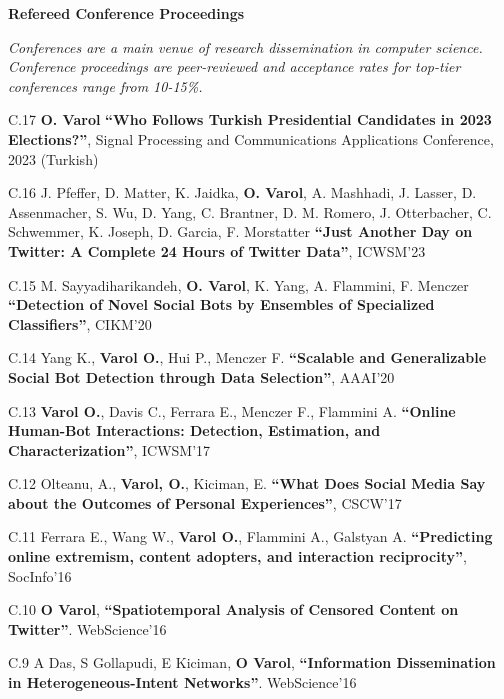 \documentclass[10pt]{article}
\newenvironment{innerlist}[1][\enskip\textbullet]%
        {\begin{compactitem}[#1]}{\end{compactitem}}
\begin{document}
\textbf{Refereed Conference Proceedings}

\textit{Conferences are a main venue of research dissemination in computer science. Conference proceedings are peer-reviewed and acceptance rates for top-tier conferences range from 10-15\%.}
\begin{innerlist}

\item[C.17] \textbf{O. Varol} \textbf{``Who Follows Turkish Presidential Candidates in 2023 Elections?''}, Signal Processing and Communications Applications Conference, 2023 (Turkish)

\item[C.16] J. Pfeffer, D. Matter, K. Jaidka, \textbf{O. Varol}, A. Mashhadi, J. Lasser, D. Assenmacher, S. Wu, D. Yang, C. Brantner, D. M. Romero, J. Otterbacher, C. Schwemmer, K. Joseph, D. Garcia, F. Morstatter \textbf{``Just Another Day on Twitter: A Complete 24 Hours of Twitter Data''}, ICWSM'23

\item[C.15] M. Sayyadiharikandeh, \textbf{O. Varol}, K. Yang, A. Flammini, F. Menczer \textbf{``Detection of Novel Social Bots by Ensembles of Specialized Classifiers''}, CIKM'20

\item[C.14] Yang K., \textbf{Varol O.}, Hui P., Menczer F. \textbf{``Scalable and Generalizable Social Bot Detection through Data Selection''}, AAAI'20

\item[C.13] \textbf{Varol O.}, Davis C., Ferrara E., Menczer F., Flammini A. \textbf{``Online Human-Bot Interactions: Detection, Estimation, and Characterization''}, ICWSM'17

\item[C.12] Olteanu, A., \textbf{Varol, O.}, Kiciman, E. \textbf{``What Does Social Media Say about the Outcomes of Personal Experiences''}, CSCW'17

\item[C.11] Ferrara E., Wang W., \textbf{Varol O.}, Flammini A., Galstyan A. \textbf{``Predicting online extremism, content adopters, and interaction reciprocity''}, SocInfo'16

\item[C.10] \textbf{O Varol}, \textbf{``Spatiotemporal Analysis of Censored Content on Twitter''}. WebScience'16

\item[C.9] A Das, S Gollapudi, E Kiciman, \textbf{O Varol}, \textbf{``Information Dissemination in Heterogeneous-Intent Networks''}. WebScience'16


\end{innerlist}
\end{document}
